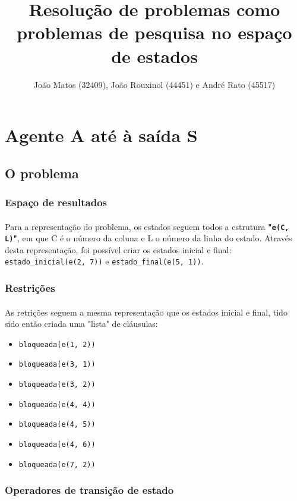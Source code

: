 \documentclass{article}
\title{Resolução de problemas como problemas de pesquisa no espaço de estados}
\author{João Matos (32409), João Rouxinol (44451) e André Rato (45517)}
\begin{document}
\maketitle

\section{Agente A até à saída S}
\subsection{O problema}
\subsubsection{Espaço de resultados}
\paragraph{} Para a representação do problema, os estados seguem todos a estrutura \textbf{"\texttt{e(C, L)}"}, em que C é o número da coluna e L o número da linha do estado. Através desta representação, foi possível criar os estados inicial e final: \texttt{estado\_inicial(e(2, 7))} e \texttt{estado\_final(e(5, 1))}.

\subsubsection{Restrições}
\paragraph{} As retrições seguem a mesma representação que os estados inicial e final, tido sido então criada uma "lista" de cláusulas:
\begin{itemize}
  \item \texttt{bloqueada(e(1, 2))}
  \item \texttt{bloqueada(e(3, 1))}
  \item \texttt{bloqueada(e(3, 2))}
  \item \texttt{bloqueada(e(4, 4))}
  \item \texttt{bloqueada(e(4, 5))}
  \item \texttt{bloqueada(e(4, 6))}
  \item \texttt{bloqueada(e(7, 2))}
\end{itemize}

\subsubsection{Operadores de transição de estado}
\end{document}
